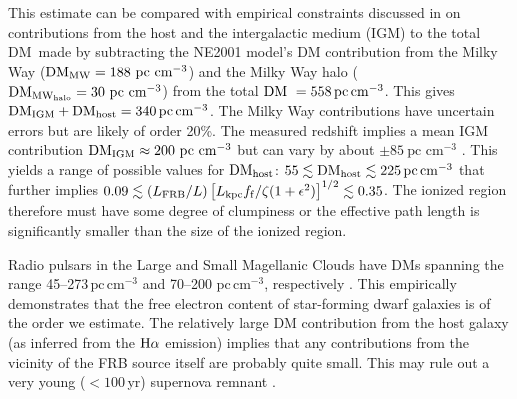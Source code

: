 \documentclass[twocolumn]{aastex61}
\newcommand{\Halpha}{\rm H\alpha}
\newcommand{\DM}{{\rm DM}}
\begin{document}
This estimate can be compared with empirical constraints  discussed in  \citet{clw+16} on contributions from the host and the intergalactic medium (IGM) to the total \DM\  made by subtracting the NE2001 model's DM contribution from the Milky Way \citep{cl02} %
($\DM_{\rm MW} = 188 \ \text{pc cm$^{-3}$}$) and the Milky Way halo ($\DM_{\rm MW_{halo}} = 30 \ \text{pc cm$^{-3}$}$) from the total $\DM\ = 558\,\mathrm{pc\,cm^{-3}}$. This gives $\DM_\mathrm{IGM} + \DM_\mathrm{host} = 340\,\mathrm{pc\,cm^{-3}}$.  
The Milky Way contributions have uncertain errors but are likely of order 20\%. 
The  measured redshift implies a mean IGM contribution $\DM_{\rm IGM} \approx 200\ \text{pc cm$^{-3}$}$ \citep{ioka03,inou04} but can vary by about $\pm 85 \ \text{pc cm$^{-3}$}$ \citep[][]{mcqu14}.   This yields a range of possible values for $\DM_{\rm host}$: $55 \lesssim \DM_{\rm host} \lesssim 225\,\mathrm{pc\,cm^{-3}}$ that further implies   
$0.09 \lesssim (L_{\rm FRB} / L) \left [L_{\rm kpc}  f_{\rm f} /  \zeta(1+\epsilon^2)\right]^{1/2} \lesssim 0.35$.
The ionized region therefore must have some degree of clumpiness or the effective path length is significantly  smaller than the size of the ionized region. 

Radio pulsars  in the Large and Small Magellanic Clouds have DMs spanning the range 45--273\,$\mathrm{pc\,cm^{-3}}$
 and  70--200 $\mathrm{pc\,cm^{-3}}$, respectively \citep{mhth05}. 
This empirically demonstrates that the free electron content of star-forming dwarf galaxies is of the order we estimate. The relatively large DM contribution from the host galaxy (as inferred from the $\Halpha$ emission) implies that any contributions from the vicinity of the FRB source itself are probably quite small. This may rule out a very young ($<100$\,yr) supernova remnant \citep[e.g. ][]{piro16}. 
\end{document}

